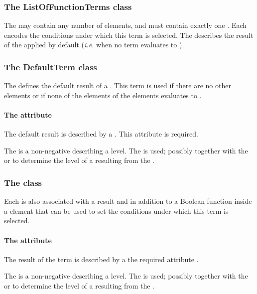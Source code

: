 \subsubsection{The ListOfFunctionTerms class}
\label{loft-class}

The \ListOfFunctionTerms may contain any number of \FunctionTerm elements, and must contain exactly one \DefaultTerm.  Each \FunctionTerm encodes the conditions under which this term is selected.  The \DefaultTerm describes the result of the \Transition applied by default ({\em i.e.} when no term evaluates to ). 
\bigskip
\subsubsection{The DefaultTerm class}
\label{defaultTerm-class}
The \DefaultTerm defines the default result of a \Transition.  This term is used if there are no other \FunctionTerm elements or if none of the  elements of the \FunctionTerm elements evaluates to . 

\paragraph{The  attribute}
The default result is described by a . This attribute is required.

The  is a non-negative  describing a level.  The  is used; possibly together with the  or  to determine the level of a \QualitativeSpecies resulting from the \Transition. 
\bigskip
\subsubsection{The  class}
\label{sec:function-term}

Each \FunctionTerm is also associated with a result  and in addition to a Boolean function inside a  element that can be used to set the conditions under which this term is selected.

\paragraph{The  attribute}
The result of the term is described by a the required attribute .

The  is a non-negative  describing a level.   The  is used; possibly together with the  or  to determine the level of a \QualitativeSpecies resulting from the \Transition. 

